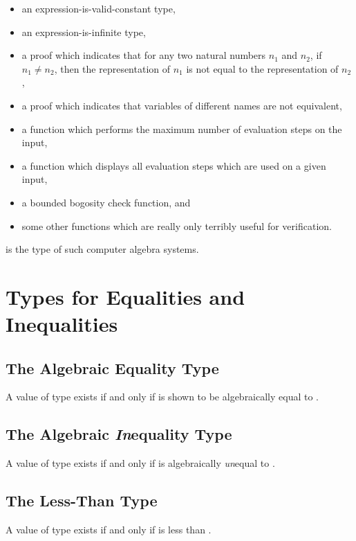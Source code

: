\documentclass{report}
\begin{document}
\begin{itemize}
  \item an expression-is-valid-constant type,
  \item an expression-is-infinite type,
  \item a proof which indicates that for any two natural numbers \(n_1\) and \(n_2\), if \(n_1 \neq n_2\), then the representation of \(n_1\) is not equal to the representation of \(n_2\),
  \item a proof which indicates that variables of different names are not equivalent,
  \item a function which performs the maximum number of evaluation steps on the input,
  \item a function which displays all evaluation steps which are used on a given input,
  \item a bounded bogosity check function, and
  \item some other functions which are really only terribly useful for verification.
\end{itemize}

 is the type of such computer algebra systems.

\section{Types for Equalities and Inequalities}

\subsection{The Algebraic Equality Type}
A value of type     exists if and only if  is shown to be algebraically equal to .

\subsection{The Algebraic \emph{In}equality Type}
A value of type     exists if and only if  is algebraically \emph{un}equal to .

\subsection{The Less-Than Type}
A value of type    exists if and only if  is less than .
\end{document}
